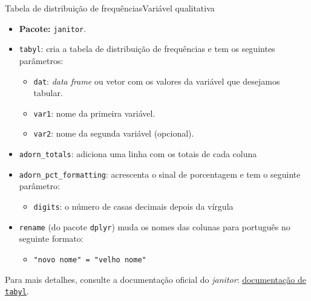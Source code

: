 \documentclass[
  10pt,
  ignorenonframetext,
]{beamer}
\providecommand{\tightlist}{%
  \setlength{\itemsep}{0pt}\setlength{\parskip}{0pt}}\usepackage{longtable,booktabs,array}
\begin{document}
\begin{frame}[fragile]{Tabela de distribuição de
frequências\newline Variável qualitativa}
\protect\hypertarget{tabela-de-distribuiuxe7uxe3o-de-frequuxeanciasvariuxe1vel-qualitativa}{}
\begin{itemize}
\tightlist
\item
  \textbf{Pacote:} \texttt{janitor}.
\item
  \texttt{tabyl}: cria a tabela de distribuição de frequências e tem os
  seguintes parâmetros:

  \begin{itemize}
  \tightlist
  \item
    \texttt{dat}: \emph{data frame} ou vetor com os valores da variável
    que desejamos tabular.
  \item
    \texttt{var1}: nome da primeira variável.
  \item
    \texttt{var2}: nome da segunda variável (opcional).
  \end{itemize}
\item
  \texttt{adorn\_totals}: adiciona uma linha com os totais de cada
  coluna
\item
  \texttt{adorn\_pct\_formatting}: acrescenta o sinal de porcentagem e
  tem o seguinte parâmetro:

  \begin{itemize}
  \tightlist
  \item
    \texttt{digits}: o número de casas decimais depois da vírgula
  \end{itemize}
\item
  \texttt{rename} (do pacote \texttt{dplyr}) muda os nomes das colunas
  para português no seguinte formato:

  \begin{itemize}
  \tightlist
  \item
    \texttt{"novo\ nome"\ =\ "velho\ nome"}
  \end{itemize}
\end{itemize}

Para mais detalhes, consulte a documentação oficial do \emph{janitor}:
\href{https://cran.r-project.org/web/packages/janitor/janitor.pdf}{documentação
de \texttt{tabyl}}.
\end{frame}
\end{document}
